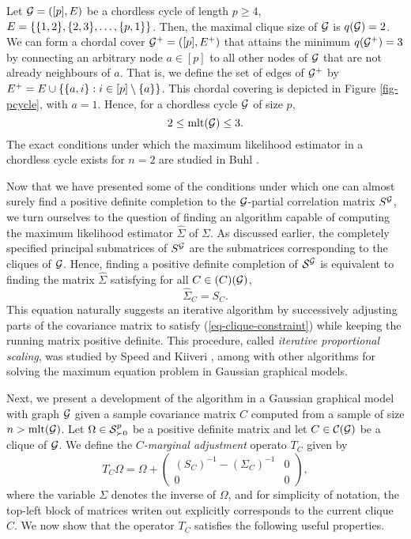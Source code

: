 \begin{example} \label{ex-pcycle}
    Let $\G = ([p], E)$ be a chordless cycle of length $p \geq 4$, $E = \eset{ \eset{1, 2}, \eset{2, 3}, \ldots, \eset{p, 1}}$. Then, the maximal clique size of $\G$ is $q(\G) = 2$. We can form a chordal cover $\G^+ = ([p], E^+)$ that attains the minimum $q(\G^+) = 3$ by connecting an arbitrary node $a \in [p]$ to all other nodes of $\G$ that are not already neighbours of $a$. That is, we define the set of edges of $\G^+$ by $E^+ = E \cup \eset{ \eset{a, i} : i \in [p] \setminus \eset{a}}$. This chordal covering is depicted in Figure \ref{fig-pcycle}, with $a = 1$. Hence, for a chordless cycle $\G$ of size $p$,
    \begin{equation*}
        2 \leq \t{mlt}(\G) \leq 3.
    \end{equation*}
    The exact conditions under which the maximum likelihood estimator in a chordless cycle exists for $n = 2$ are studied in Buhl \cite[Section 4]{Buhl1993OnTE}.
\end{example}


Now that we have presented some of the conditions under which one can almost surely find a positive definite completion to the $\G$-partial correlation matrix $S^\G$, we turn ourselves to the question of finding an algorithm capable of computing the maximum likelihood estimator $\hat\Sigma$ of $\Sigma$. As discussed earlier, the completely specified principal submatrices of $S^\G$ are the submatrices corresponding to the cliques of $\G$. Hence, finding a positive definite completion of $\S^\G$ is equivalent to finding the matrix $\hat\Sigma$ satisfying for all $C \in \c(C)(\G)$,
\begin{equation} \label{eq-clique-constraint}
    \hat\Sigma_C = S_C.
\end{equation}
This equation naturally suggests an iterative algorithm by successively adjusting parts of the covariance matrix to satisfy (\ref{eq-clique-constraint}) while keeping the running matrix positive definite. This procedure, called \textit{iterative proportional scaling}, was studied by Speed and Kiiveri \cite{speed1986gaussian}, among with other algorithms for solving the maximum equation problem in Gaussian graphical models.

Next, we present a development of the algorithm in a Gaussian graphical model with graph $\G$ given a sample covariance matrix $C$ computed from a sample of size $n > \t{mlt}(\G)$. Let $\Omega \in \S^p_{\succ 0}$ be a positive definite matrix and let $C \in \c{C}(\G)$ be a clique of $\G$. We define the \textit{$C$-marginal adjustment} operato $T_C$ given by
\begin{equation} \label{eq-tc-1}
    T_C \Omega = \Omega + \begin{pmatrix}
        (S_C)^{-1} - (\Sigma_C)^{-1} & 0\\
        0 & 0 
        \end{pmatrix},
\end{equation}
where the variable $\Sigma$ denotes the inverse of $\Omega$, and for simplicity of notation, the top-left block of matrices writen out explicitly corresponds to the current clique $C$. We now show that the operator $T_C$ satisfies the following useful properties.



